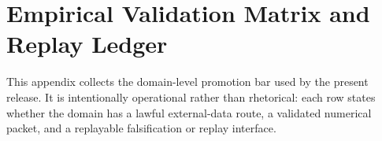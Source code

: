 \section{Empirical Validation Matrix and Replay Ledger}

This appendix collects the domain-level promotion bar used by the present release. It is intentionally operational rather than rhetorical: each row states whether the domain has a lawful external-data route, a validated numerical packet, and a replayable falsification or replay interface.

